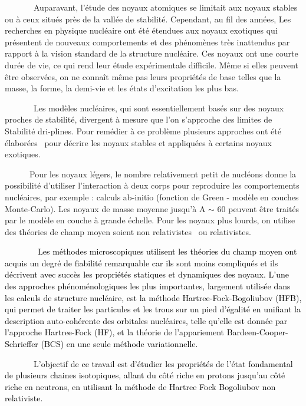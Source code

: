 \documentclass[a4paper]{article}
\begin{document}
\ \ \ \ \ \ \ Auparavant, l'étude des noyaux atomiques se limitait aux noyaux stables ou à ceux situés près de la vallée
de stabilité. Cependant, au fil des années, \textcolor[rgb]{0.1254902,0.12941177,0.14117648}{Les recherches en physique
nucléaire ont été étendues aux noyaux exotiques qui }présentent de nouveaux comportements et des phénomènes très
inattendus par rapport à la vision standard de la structure nucléaire\textcolor[rgb]{0.1254902,0.12941177,0.14117648}{.
Ces noyaux ont une courte durée de vie, ce qui rend leur étude e}xpérimentale difficile. Même si elles peuvent être
observées, on ne connaît même pas leurs propriétés de base telles que la masse, la forme, la demi-vie et les états
d’excitation les plus bas.

\ \ \ \ \ \ \ Les modèles nucléaires, qui sont essentiellement basés sur des noyaux proches de stabilité, divergent à
mesure que l'on s'approche des limites de Stabilité {\textquotedbl}dri-plines{\textquotedbl}. Pour remédier à ce
problème plusieurs approches ont été élaborées \ pour décrire les noyaux stables et appliquées à certains noyaux
exotiques.

\ \ \ \ \ \ Pour les noyaux légers, le nombre relativement petit de nucléons donne la possibilité d’utiliser
l’interaction à deux corps pour reproduire les comportements nucléaires, par exemple : calculs ab-initio (fonction de
Green - modèle en couches Monte-Carlo). Les noyaux de masse moyenne jusqu’à A ${\sim}$ 60 peuvent être traités par le
modèle en couche à grande échelle. Pour les noyaux plus lourds, on utilise des théories de champ moyen soient non
relativistes \ ou relativistes. 

\textcolor{black}{\ \ \ \ \ \ \ \ Les méthodes microscopiques utilisent les théories du champ moyen ont acquis un degré
de fiabilité remarquable car ils sont moins compliqués et ils décrivent avec succès les propriétés statiques et
dynamiques des noyaux. L'une des approches phénoménologiques les plus importantes, largement utilisée dans les calculs
de structure nucléaire, est la méthode Hartree-Fock-Bogoliubov (HFB), qui permet de traiter les particules et les trous
sur un pied d'égalité en unifiant la description auto-cohérente des orbitales nucléaires, telle qu'elle est donnée par
l'approche Hartree-Fock (HF), et la théorie de l'appariement Bardeen-Cooper-Schrieffer (BCS) en une seule méthode
variationnelle.}

\textcolor{black}{\ \ \ \ \ \ \ L’objectif de ce travail est d’étudier les propriétés de l’état fondamental de plusieurs
chaines isotopiques, allant du côté riche en protons jusqu’au côté riche en neutrons, en utilisant la méthode de
Hartree Fock Bogoliubov non relativiste.}
\end{document}
